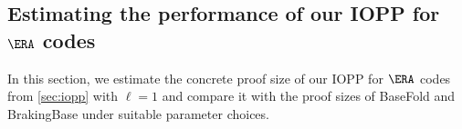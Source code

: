 






\subsection{Estimating the performance of our IOPP for \texorpdfstring{$\ERA$}{ERA} codes}
\label{sec:eval-iopp-performance}

In this section, we estimate the concrete proof size of our IOPP for $\ERA$ codes from \cref{sec:iopp} with $\ell = 1$ and compare it with the proof sizes of BaseFold \cite{ZeilbergerCF24} and BrakingBase \cite{NairST25} under suitable parameter choices.

